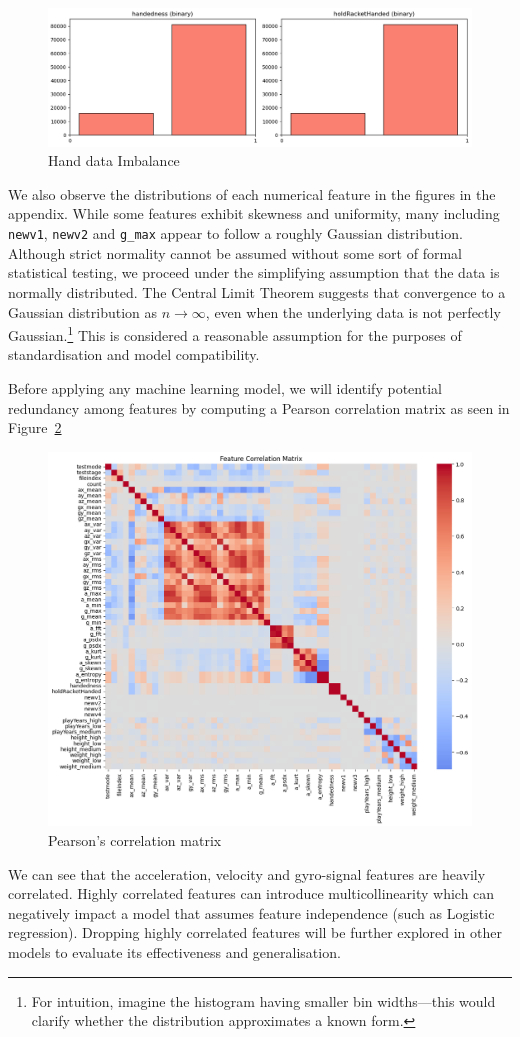 \documentclass[10pt,twocolumn]{article}
\begin{document}
\begin{figure}[H]
    \centering
    \includegraphics[width=0.85\linewidth]{images/hand_data.png}
    \caption{Hand data Imbalance}
    \label{fig:stacked-hand-results}
\end{figure}

We also observe the distributions of each numerical feature in the figures in the appendix. While some features exhibit skewness and uniformity, many including \texttt{newv1}, \texttt{newv2} and \texttt{g\_max} appear to follow a roughly Gaussian distribution. Although strict normality cannot be assumed without some sort of formal statistical testing, we proceed under the simplifying assumption that the data is normally distributed.  The Central Limit Theorem suggests that convergence to a Gaussian distribution as $n \rightarrow \infty $, even when the underlying data is not perfectly Gaussian.\footnote{For intuition, imagine the histogram having smaller bin widths—this would clarify whether the distribution approximates a known form.}
 This is considered a reasonable assumption for the purposes of standardisation and model compatibility.

Before applying any machine learning model, we will identify potential redundancy among features by computing a Pearson correlation matrix as seen in Figure~\ref{fig:correlation-matrix}
\begin{figure}[H]
    \centering
    \includegraphics[width=0.85\linewidth]{images/correlation_matrix.png}
    \caption{Pearson's correlation matrix}
    \label{fig:correlation-matrix}
\end{figure}
We can see that the acceleration, velocity and gyro-signal features are heavily correlated. Highly correlated features can introduce multicollinearity which can negatively impact a model that assumes feature independence (such as Logistic regression). Dropping highly correlated features will be further explored in other models to evaluate its effectiveness and generalisation.
\end{document}
